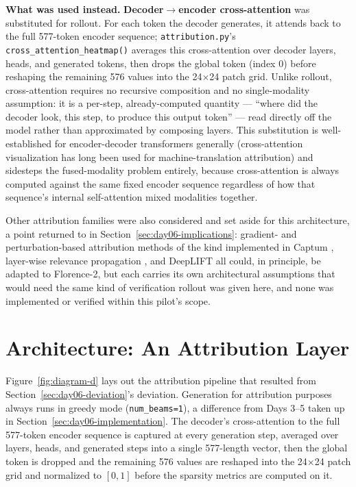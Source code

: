 \textbf{What was used instead.} \textbf{Decoder$\to$encoder cross-attention} was substituted for
rollout. For each token the decoder generates, it attends back to the full 577-token encoder
sequence; \texttt{attribution.py}'s \texttt{cross\_attention\_heatmap()} averages this
cross-attention over decoder layers, heads, and generated tokens, then drops the global token
(index 0) before reshaping the remaining 576 values into the 24$\times$24 patch grid. Unlike
rollout, cross-attention requires no recursive composition and no single-modality assumption: it
is a per-step, already-computed quantity --- ``where did the decoder look, this step, to produce
this output token'' --- read directly off the model rather than approximated by composing layers.
This substitution is well-established for encoder-decoder transformers generally (cross-attention
visualization has long been used for machine-translation attribution) and sidesteps the fused-modality
problem entirely, because cross-attention is always computed against the same fixed encoder
sequence regardless of how that sequence's internal self-attention mixed modalities together.

Other attribution families were also considered and set aside for this architecture, a point
returned to in Section~\ref{sec:day06-implications}: gradient- and perturbation-based attribution
methods of the kind implemented in Captum \citep{kokhlikyan2020captum}, layer-wise relevance
propagation \citep{bach2015lrp}, and DeepLIFT \citep{shrikumar2017deeplift} all could, in
principle, be adapted to Florence-2, but each carries its own architectural assumptions that would
need the same kind of verification rollout was given here, and none was implemented or verified
within this pilot's scope.

\section{Architecture: An Attribution Layer}

Figure~\ref{fig:diagram-d} lays out the attribution pipeline that resulted from
Section~\ref{sec:day06-deviation}'s deviation. Generation for attribution purposes always runs in
greedy mode (\texttt{num\_beams=1}), a difference from Days 3--5 taken up in
Section~\ref{sec:day06-implementation}. The decoder's cross-attention to the full 577-token
encoder sequence is captured at every generation step, averaged over layers, heads, and generated
steps into a single 577-length vector, then the global token is dropped and the remaining 576
values are reshaped into the 24$\times$24 patch grid and normalized to $[0,1]$ before the sparsity
metrics are computed on it.

